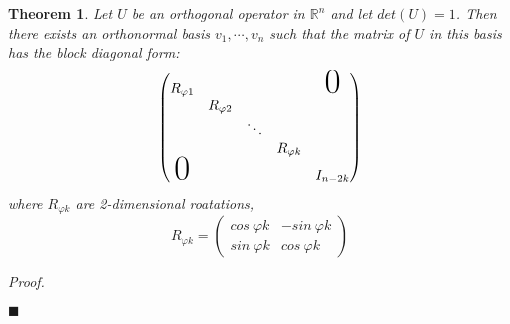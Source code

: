 \documentclass[a4paper,10pt]{book}
\newcommand{\R}{\mathbb{R}}
\theoremstyle{plain}
\newtheorem{theorem}{Theorem}[section]
\renewenvironment{proof}{\textsl{Proof.}}{\hfill$\blacksquare$}
\theoremstyle{plain}
\theoremstyle{definition}
\begin{document}
\begin{theorem}
Let $U$ be an orthogonal operator in $\R^{n}$ and let $det(U) = 1$. Then there exists an orthonormal basis $v_{1}, \cdots, v_{n}$ such that the matrix of $U$ in this basis has the \textit{block diagonal form}:
$$\begin{pmatrix}
R_{\varphi 1} & & & & \makebox{\Huge 0} \\
 & R_{\varphi 2} & & & \\ 
 & & \ddots & & \\
 & & & R_{\varphi k} & \\
 \makebox{\Huge 0} & & & & I_{n - 2k}
\end{pmatrix}$$
where $R_{\varphi k}$ are 2-dimensional roatations, 
$$R_{\varphi k} = \begin{pmatrix}
cos \ \varphi k & -sin \  \varphi k \\
sin \ \varphi k & cos \ \varphi k
\end{pmatrix}$$
\end{theorem}

\begin{proof}

\end{proof}
\end{document}
